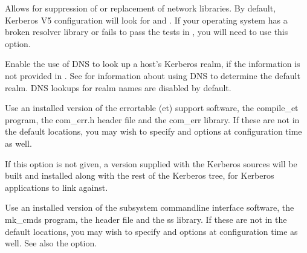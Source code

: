 \documentclass[letterpaper,10pt,english]{sphinxmanual}
\begin{document}
\begin{description}
\sphinxAtStartPar
Allows for suppression of or replacement of network libraries.  By
default, Kerberos V5 configuration will look for  and
.  If your operating system has a broken resolver
library or fails to pass the tests in , you
will need to use this option.

\sphinxAtStartPar
Enable the use of DNS to look up a host’s Kerberos realm,
if the information is not provided in
.  See 
for information about using DNS to determine the default realm.
DNS lookups for realm names are disabled by default.

\sphinxAtStartPar
Use an installed version of the error\sphinxhyphen{}table (et) support software,
the compile\_et program, the com\_err.h header file and the com\_err
library.  If these are not in the default locations, you may wish
to specify  and
 options at configuration time as
well.

\sphinxAtStartPar
If this option is not given, a version supplied with the Kerberos
sources will be built and installed along with the rest of the
Kerberos tree, for Kerberos applications to link against.

\sphinxAtStartPar
Use an installed version of the subsystem command\sphinxhyphen{}line interface
software, the mk\_cmds program, the  header file and the
ss library.  If these are not in the default locations, you may
wish to specify  and
 options at configuration time as
well.  See also the  option.


\end{description}
\end{document}
